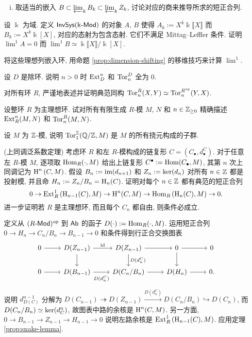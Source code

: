 \begin{Exercises}
\begin{enumerate}[(i)]
		\item 取适当的嵌入 $B \subset \varprojlim_k B_k \subset \varprojlim_k Z_k$, 讨论对应的商来推导所求的短正合列.
	\end{enumerate}

	\item 设 $\Bbbk$ 为域. 定义 $\mathsf{InvSys}(\Bbbk\text{-}\mathsf{Mod})$ 的对象 $A$, $B$ 使得 $A_k := X^k \Bbbk\llbracket X\rrbracket$ 而 $B_k := X^k \Bbbk[X]$, 对应的态射为包含态射. 它们不满足 Mittag--Leffler 条件. 证明 $\lim\nolimits^1 A = 0$ 而 $\lim\nolimits^1 B \simeq \Bbbk\llbracket X \rrbracket/\Bbbk[X]$.
	\begin{hint}
		将这些理想列嵌入环, 用命题 \ref{prop:dimension-shifting} 的移维技巧来计算 $\lim\nolimits^1$.
	\end{hint}

	\item 设 $D$ 是除环. 说明 $n > 0$ 时 $\operatorname{Ext}^n_D$ 和 $\operatorname{Tor}^D_n$ 全为 $0$.

	\item 对所有环 $R$, 严谨地表述并证明典范同构 $\operatorname{Tor}^R_n(X, Y) \simeq \operatorname{Tor}^{R^{\operatorname{op}}}_n(Y, X)$.

	\item 设整环 $R$ 为主理想环. 试对所有有限生成 $R$-模 $M$, $N$ 和 $n \in \mathbb{Z}_{\geq 0}$ 精确描述 $\operatorname{Ext}^n_R(M, N)$ 和 $\operatorname{Tor}_n^R(M, N)$.

	\item 设 $M$ 为 $\mathbb{Z}$-模, 说明 $\operatorname{Tor}_1^{\mathbb{Z}}(\mathbb{Q}/\mathbb{Z}, M)$ 是 $M$ 的所有挠元构成的子群.

	\item (上同调泛系数定理) 考虑环 $R$ 和左 $R$-模构成的链复形 $C = (C_\bullet, d^C_\bullet)$. 对于任意左 $R$-模 $M$, 逐项取 $\operatorname{Hom}_R(\cdot, M)$ 给出上链复形 $C^\bullet := \operatorname{Hom}(C_\bullet, M)$, 其第 $n$ 次上同调记为 $\operatorname{H}^n\left(C, M \right)$. 假设 $B_n := \operatorname{im}(d_{n+1})$ 和 $Z_n := \operatorname{ker}(d_n)$ 对所有 $n \in \mathbb{Z}$ 都是投射模, 并且命 $H_n := Z_n/B_n = \operatorname{H}_n(C)$. 证明对每个 $n \in \mathbb{Z}$ 都有典范的短正合列
	\[ 0 \to \operatorname{Ext}^1_R\left( \operatorname{H}_{n-1}(C), M \right) \to \operatorname{H}^n(C, M) \to \operatorname{Hom}_R\left( \operatorname{H}_n(C), M \right) \to 0. \]
	进一步证明若 $R$ 是主理想环, 而且每个 $C_n$ 都自由, 则条件必成立.
	
	\begin{hint}
		定义从 $(R\text{-}\mathsf{Mod})^{\operatorname{op}}$ 到 $\mathsf{Ab}$ 的函子 $D(\cdot) := \operatorname{Hom}_R(\cdot, M)$. 运用短正合列 $0 \to H_n \to C_n/B_n \to B_{n-1} \to 0$ 和条件得到行正合交换图表
		\[\begin{tikzcd}
			0 \arrow[r] & D(Z_{n-1}) \arrow[r, "\identity"] \arrow[d] & D(Z_{n-1}) \arrow[r] \arrow[d, "{D(d^C_n)}"] & 0 \arrow[r] \arrow[d] & 0 \\
			0 \arrow[r] & D(B_{n-1}) \arrow[r, "{D(d^C_n)}"' inner sep=0.5em] & D(C_n/B_n) \arrow[r] & D(H_n) \arrow[r] & 0 .
		\end{tikzcd}\]
		说明 $d_{D(C)}^{n-1}$ 分解为 $D(C_{n-1}) \twoheadrightarrow D(Z_{n-1}) \xrightarrow{D(d^C_n)} D(C_n/B_n) \hookrightarrow D(C_n)$, 而 $D(C_n/B_n) \simeq \operatorname{ker}(d_C^n)$, 故图表中路的余核是 $\operatorname{H}^n(C, M)$. 另一方面, $0 \to B_{n-1} \to Z_{n-1} \to H_{n-1} \to 0$ 说明左路余核是 $\operatorname{Ext}^1_R\left(\operatorname{H}_{n-1}(C), M \right)$. 应用定理 \ref{prop:snake-lemma}.
	\end{hint}


\end{Exercises}
